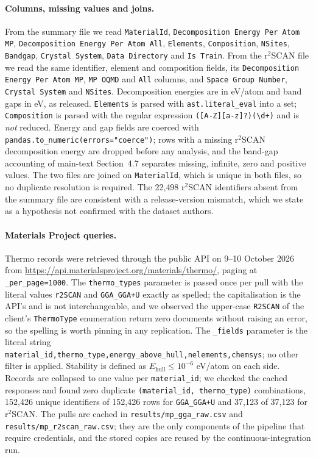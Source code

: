 \documentclass[11pt]{article}
\begin{document}
\paragraph{Columns, missing values and joins.} From the summary file we read
\texttt{MaterialId}, \texttt{Decomposition Energy Per Atom MP}, \texttt{Decomposition
Energy Per Atom All}, \texttt{Elements}, \texttt{Composition}, \texttt{NSites},
\texttt{Bandgap}, \texttt{Crystal System}, \texttt{Data Directory} and \texttt{Is Train}.
From the r$^2$SCAN file we read the same identifier, element and composition fields,
its \texttt{Decomposition Energy Per Atom MP}, \texttt{MP OQMD} and \texttt{All}
columns, and \texttt{Space Group Number}, \texttt{Crystal System} and \texttt{NSites}. Decomposition
energies are in eV/atom and band gaps in eV, as released. \texttt{Elements} is parsed
with \texttt{ast.literal\_eval} into a set; \texttt{Composition} is parsed with the
regular expression \texttt{([A-Z][a-z]?)(\textbackslash d+)} and is \emph{not} reduced.
Energy and gap fields are coerced with \texttt{pandas.to\_numeric(errors="coerce")};
rows with a missing r$^2$SCAN decomposition energy are dropped before any analysis, and
the band-gap accounting of main-text Section~4.7 separates missing, infinite, zero and
positive values. The two files are joined on \texttt{MaterialId}, which is unique in both
files, so no duplicate resolution is required. The 22{,}498 r$^2$SCAN identifiers absent
from the summary file are consistent with a release-version mismatch, which we state as
a hypothesis not confirmed with the dataset authors.

\paragraph{Materials Project queries.} Thermo records were retrieved through the public
API on 9--10 October 2026 from
\url{https://api.materialsproject.org/materials/thermo/}, paging at
\texttt{\_per\_page=1000}. The \texttt{thermo\_types} parameter is passed once per pull
with the literal values \texttt{r2SCAN} and \texttt{GGA\_GGA+U} exactly as spelled; the
capitalisation is the API's and is not interchangeable, and we observed the upper-case
\texttt{R2SCAN} of the client's \texttt{ThermoType} enumeration return zero documents
without raising an error, so the spelling is worth pinning in any replication. The
\texttt{\_fields} parameter is the literal string
\texttt{material\_id,thermo\_type,energy\_above\_hull,nelements,chemsys}; no other filter
is applied. Stability is defined as $E_{\text{hull}} \le 10^{-6}$ eV/atom on each side.
Records are collapsed to one value per \texttt{material\_id}; we checked the cached
responses and found zero duplicate \texttt{(material\_id, thermo\_type)} combinations,
152{,}426 unique identifiers of 152{,}426 rows for \texttt{GGA\_GGA+U} and 37{,}123 of
37{,}123 for r$^2$SCAN. The pulls are cached in \texttt{results/mp\_gga\_raw.csv} and
\texttt{results/mp\_r2scan\_raw.csv}; they are the only components of the pipeline that
require credentials, and the stored copies are reused by the continuous-integration run.
\end{document}
